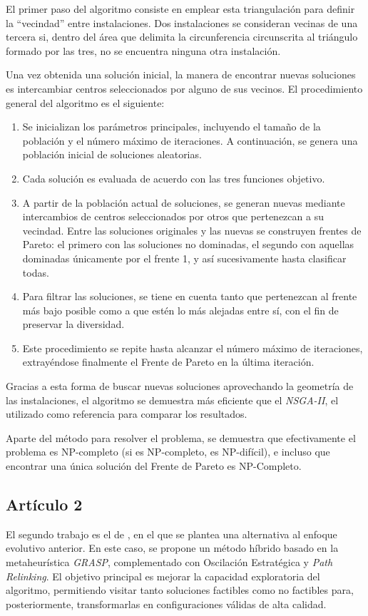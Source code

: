 \documentclass[12pt,a4paper]{book}
\begin{document}
El primer paso del algoritmo consiste en emplear esta triangulación para definir la ``vecindad'' entre instalaciones. Dos instalaciones se consideran vecinas de una tercera si, 
dentro del área que delimita la circunferencia circunscrita al triángulo formado por las tres, no se encuentra ninguna otra instalación. 

Una vez obtenida una solución inicial, la manera de encontrar nuevas soluciones es intercambiar centros seleccionados por alguno de sus vecinos. El procedimiento general del algoritmo es el siguiente:

\begin{enumerate}
    \item Se inicializan los parámetros principales, incluyendo el tamaño de la población y el número máximo de iteraciones. A continuación, se genera una población inicial de soluciones aleatorias.
    \item Cada solución es evaluada de acuerdo con las tres funciones objetivo.
    \item A partir de la población actual de soluciones, se generan nuevas mediante intercambios de centros seleccionados por otros que pertenezcan a su vecindad. Entre las soluciones originales y las nuevas se construyen frentes
    de Pareto: el primero con las soluciones no dominadas, el segundo con aquellas dominadas únicamente por el frente 1, y así sucesivamente hasta clasificar todas. 
    \item Para filtrar las soluciones, se tiene en cuenta tanto que pertenezcan al frente más bajo posible como a que estén lo más alejadas entre sí, con el fin de preservar la diversidad. 
    \item Este procedimiento se repite hasta alcanzar el número máximo de iteraciones,  extrayéndose finalmente el Frente de Pareto en la última iteración.
\end{enumerate}
Gracias a esta forma de buscar nuevas soluciones aprovechando la geometría de las instalaciones, el algoritmo se demuestra más eficiente que el \textit{NSGA-II}, el utilizado como 
referencia para comparar los resultados. 

Aparte del método para resolver el problema, se demuestra que efectivamente el problema es NP-completo (si es NP-completo, es NP-difícil), e incluso que encontrar una única
solución del Frente de Pareto es NP-Completo.

\subsection{Artículo 2}
El segundo trabajo es el de \cite{k-Balanced_2}, en el que se plantea una alternativa al enfoque evolutivo anterior. En este caso, se propone un método híbrido basado en la metaheurística \textit{GRASP}, complementado con Oscilación Estratégica y \textit{Path Relinking}. El objetivo principal es mejorar la capacidad exploratoria del algoritmo, permitiendo visitar tanto soluciones factibles como no factibles para, posteriormente, transformarlas en configuraciones válidas de alta calidad.
\end{document}

